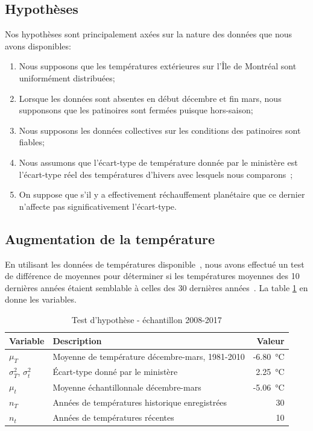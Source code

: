 \documentclass[12pt]{article}
\numberwithin{figure}{section}
\numberwithin{table}{section}
\begin{document}
\subsection{Hypoth\`eses}

Nos hypoth\`eses sont principalement ax\'ees sur la nature des donn\'ees que nous avons disponibles:

\begin{enumerate}
    \item Nous supposons que les temp\'eratures ext\'erieures sur l'\^Ile de Montr\'eal sont
        uniform\'ement distribu\'ees;
    \item Lorsque les donn\'ees sont absentes en d\'ebut d\'ecembre et fin mars, nous supponsons que
        les patinoires sont ferm\'ees puisque hors-saison;
    \item Nous supposons les donn\'ees collectives sur les conditions des patinoires sont fiables;
    \item Nous assumons que l'\'ecart-type de temp\'erature donn\'ee par le minist\`ere est
        l'\'ecart-type r\'eel des temp\'eratures d'hivers avec lesquels nous comparons~\cite{AvgTemp};
    \item On suppose que s'il y a effectivement r\'echauffement plan\'etaire que ce dernier
        n'affecte pas significativement l'\'ecart-type.
\end{enumerate}

\subsection{Augmentation de la temp\'erature}

En utilisant les donn\'ees de temp\'eratures disponible~\cite{TempHist}, nous avons effectu\'e un
test de diff\'erence de moyennes pour d\'eterminer si les temp\'eratures moyennes des 10 derni\`eres
ann\'ees \'etaient semblable \`a celles des 30 derni\`eres ann\'ees~\cite{MeteoTemp}. La table
\ref{vars:hyptest} en donne les variables.

\begin{table}
    \centering
    \begin{tabular}{|l|l|r|}\hline
        Variable &Description &Valeur\\\hline
        $\mu_T$ &Moyenne de temp\'erature d\'ecembre-mars, 1981-2010 &-\SI{6.80}\celsius\\\hline
        $\sigma_T^2$, $\sigma_t^2$ &\'Ecart-type donn\'e par le minist\`ere &\SI{2.25}\celsius\\\hline
        $\mu_t$ &Moyenne \'echantillonnale d\'ecembre-mars &-\SI{5.06}\celsius\\\hline
        $n_T$ &Ann\'ees de temp\'eratures historique enregistr\'ees &30\\\hline
        $n_t$ &Ann\'ees de temp\'eratures r\'ecentes &10\\\hline
    \end{tabular}
    \caption{Test d'hypoth\`ese - \'echantillon 2008-2017}\label{vars:hyptest}
\end{table}
\end{document}
